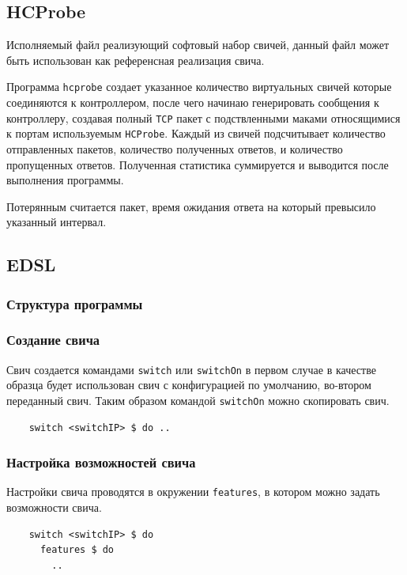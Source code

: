 \documentclass[9pt,a4paper]{article}
\begin{document}
\subsection{HCProbe}

Исполняемый файл реализующий софтовый набор свичей, данный файл может быть использован как референсная реализация свича.

Программа \texttt{hcprobe} создает указанное количество виртуальных свичей
которые соединяются к контроллером, после чего начинаю генерировать сообщения
к контроллеру, создавая полный \texttt{TCP} пакет с подствленными маками
относящимися к портам используемым \texttt{HCProbe}. Каждый из свичей 
подсчитывает количество отправленных пакетов, количество полученных ответов,
и количество пропущенных ответов. Полученная статистика суммируется и выводится
после выполнения программы.

Потерянным считается пакет, время ожидания ответа на который превысило указанный
интервал.


\subsection{EDSL}

\subsubsection{Структура программы}
\subsubsection{Создание свича}
Свич создается командами \lstinline!switch! или \lstinline!switchOn! в первом случае
в качестве образца будет использован свич с конфигурацией по умолчанию, во-втором 
переданный свич. Таким образом командой \lstinline!switchOn! можно скопировать свич.

\begin{lstlisting}
    switch <switchIP> $ do ..
\end{lstlisting}

\subsubsection{Настройка возможностей свича}

Настройки свича проводятся в окружении \lstinline!features!, в котором можно задать
возможности свича.

\begin{lstlisting}
    switch <switchIP> $ do
      features $ do
        ..
\end{lstlisting}
\end{document}
